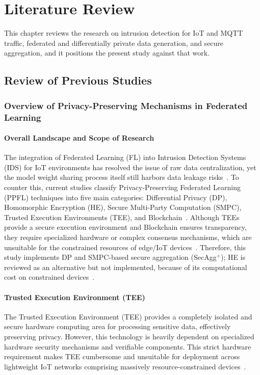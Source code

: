 \chapter{Literature Review}
This chapter reviews the research on intrusion detection for IoT and MQTT traffic, federated and differentially private data generation, and secure aggregation, and it positions the present study against that work.

\section{Review of Previous Studies}

\subsection{Overview of Privacy-Preserving Mechanisms in Federated Learning}

\subsubsection*{Overall Landscape and Scope of Research}
The integration of Federated Learning (FL) into Intrusion Detection Systems (IDS) for IoT environments has resolved the issue of raw data centralization, yet the model weight sharing process itself still harbors data leakage risks~\cite{vyas2024}. To counter this, current studies classify Privacy-Preserving Federated Learning (PPFL) techniques into five main categories: Differential Privacy (DP), Homomorphic Encryption (HE), Secure Multi-Party Computation (SMPC), Trusted Execution Environments (TEE), and Blockchain~\cite{vyas2024}. Although TEEs provide a secure execution environment and Blockchain ensures transparency, they require specialized hardware or complex consensus mechanisms, which are unsuitable for the constrained resources of edge/IoT devices~\cite{manzano2025}. Therefore, this study implements DP and SMPC-based secure aggregation (SecAgg$^+$); HE is reviewed as an alternative but not implemented, because of its computational cost on constrained devices~\cite{nakayiza2026}.

\subsubsection*{Trusted Execution Environment (TEE)}
The Trusted Execution Environment (TEE) provides a completely isolated and secure hardware computing area for processing sensitive data, effectively preserving privacy. However, this technology is heavily dependent on specialized hardware security mechanisms and verifiable components. This strict hardware requirement makes TEE cumbersome and unsuitable for deployment across lightweight IoT networks comprising massively resource-constrained devices~\cite{vyas2024}.

